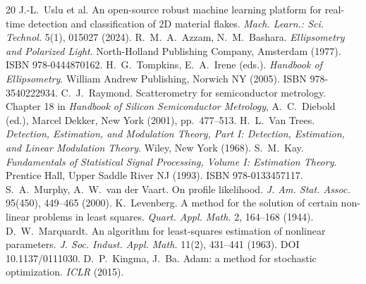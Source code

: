 \documentclass[10pt]{article}
\begin{document}
\begin{thebibliography}{20}
 J.-L.~Uslu et al. An open-source robust machine learning platform for real-time detection and classification of 2D material flakes. \emph{Mach. Learn.: Sci. Technol.} 5(1), 015027 (2024).
 R.~M.~A.~Azzam, N.~M.~Bashara. \emph{Ellipsometry and Polarized Light}. North-Holland Publishing Company, Amsterdam (1977). ISBN 978-0444870162.
 H.~G.~Tompkins, E.~A.~Irene (eds.). \emph{Handbook of Ellipsometry}. William Andrew Publishing, Norwich NY (2005). ISBN 978-3540222934.
 C.~J.~Raymond. Scatterometry for semiconductor metrology. Chapter 18 in \emph{Handbook of Silicon Semiconductor Metrology}, A.~C.~Diebold (ed.), Marcel Dekker, New York (2001), pp.~477--513.
 H.~L.~Van Trees. \emph{Detection, Estimation, and Modulation Theory, Part I: Detection, Estimation, and Linear Modulation Theory}. Wiley, New York (1968).
 S.~M.~Kay. \emph{Fundamentals of Statistical Signal Processing, Volume I: Estimation Theory}. Prentice Hall, Upper Saddle River NJ (1993). ISBN 978-0133457117.
 S.~A.~Murphy, A.~W.~van der Vaart. On profile likelihood. \emph{J. Am. Stat. Assoc.} 95(450), 449--465 (2000).
 K.~Levenberg. A method for the solution of certain non-linear problems in least squares. \emph{Quart. Appl. Math.} 2, 164--168 (1944).
 D.~W.~Marquardt. An algorithm for least-squares estimation of nonlinear parameters. \emph{J. Soc. Indust. Appl. Math.} 11(2), 431--441 (1963). DOI 10.1137/0111030.
 D.~P.~Kingma, J.~Ba. Adam: a method for stochastic optimization. \emph{ICLR} (2015).
\end{thebibliography}
\end{document}
